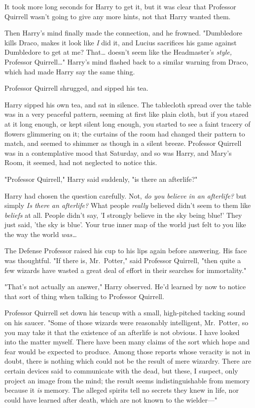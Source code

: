 It took more long seconds for Harry to get it, but it was clear that Professor 
Quirrell wasn't going to give any more hints, not that Harry wanted them.

Then Harry's mind finally made the connection, and he frowned. "Dumbledore 
kills Draco, makes it look like \emph{I} did it, and Lucius sacrifices his game 
against Dumbledore to get at me? That{\ldots} doesn't seem like the 
Headmaster's \emph{style,} Professor Quirrell{\ldots}" Harry's mind flashed 
back to a similar warning from Draco, which had made Harry say the same thing.

Professor Quirrell shrugged, and sipped his tea.

Harry sipped his own tea, and sat in silence. The tablecloth spread over the 
table was in a very peaceful pattern, seeming at first like plain cloth, but if 
you stared at it long enough, or kept silent long enough, you started to see a 
faint tracery of flowers glimmering on it; the curtains of the room had changed 
their pattern to match, and seemed to shimmer as though in a silent breeze. 
Professor Quirrell was in a contemplative mood that Saturday, and so was Harry, 
and Mary's Room, it seemed, had not neglected to notice this.

"Professor Quirrell," Harry said suddenly, "is there an afterlife?"

Harry had chosen the question carefully. Not, \emph{do you believe in an 
afterlife?} but simply \emph{Is there an afterlife?} What people \emph{really} 
believed didn't seem to them like \emph{beliefs} at all. People didn't say, 'I 
strongly believe in the sky being blue!' They just said, 'the sky is blue'. 
Your true inner map of the world just felt to you like the way the world 
\emph{was{\ldots}}

The Defense Professor raised his cup to his lips again before answering. His 
face was thoughtful. "If there is, Mr.~Potter," said Professor Quirrell, "then 
quite a few wizards have wasted a great deal of effort in their searches for 
immortality."

"That's not actually an answer," Harry observed. He'd learned by now to notice 
that sort of thing when talking to Professor Quirrell.

Professor Quirrell set down his teacup with a small, high-pitched tacking sound 
on his saucer. "Some of those wizards were reasonably intelligent, Mr.~Potter, 
so you may take it that the existence of an afterlife is not obvious. I have 
looked into the matter myself. There have been many claims of the sort which 
hope and fear would be expected to produce. Among those reports whose veracity 
is not in doubt, there is nothing which could not be the result of mere 
wizardry. There are certain devices said to communicate with the dead, but 
these, I suspect, only project an image from the mind; the result seems 
indistinguishable from memory because it \emph{is} memory. The alleged spirits 
tell no secrets they knew in life, nor could have learned after death, which 
are not known to the wielder---"

